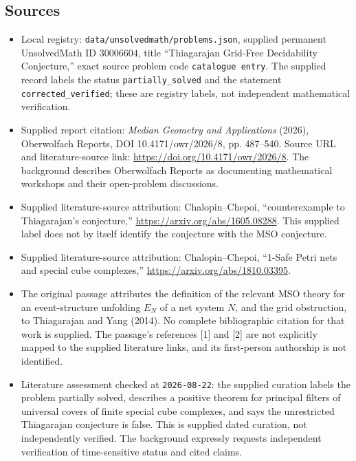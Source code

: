 \documentclass[11pt]{article}
\begin{document}
\subsection{Sources}
\begin{itemize}
\item Local registry: \texttt{data/unsolvedmath/problems.json}, supplied permanent UnsolvedMath ID \(30006604\), title ``Thiagarajan Grid-Free Decidability Conjecture,'' exact source problem code \texttt{catalogue entry}. The supplied record labels the status \texttt{partially\_solved} and the statement \texttt{corrected\_verified}; these are registry labels, not independent mathematical verification.
\item Supplied report citation: \emph{Median Geometry and Applications} (2026), Oberwolfach Reports, DOI 10.4171/owr/2026/8, pp. 487--540. Source URL and literature-source link: \url{https://doi.org/10.4171/owr/2026/8}. The background describes Oberwolfach Reports as documenting mathematical workshops and their open-problem discussions.
\item Supplied literature-source attribution: Chalopin--Chepoi, ``counterexample to Thiagarajan's conjecture,'' \url{https://arxiv.org/abs/1605.08288}. This supplied label does not by itself identify the conjecture with the MSO conjecture.
\item Supplied literature-source attribution: Chalopin--Chepoi, ``1-Safe Petri nets and special cube complexes,'' \url{https://arxiv.org/abs/1810.03395}.
\item The original passage attributes the definition of the relevant MSO theory for an event-structure unfolding \(E_N\) of a net system \(N\), and the grid obstruction, to Thiagarajan and Yang (2014). No complete bibliographic citation for that work is supplied. The passage's references [1] and [2] are not explicitly mapped to the supplied literature links, and its first-person authorship is not identified.
\item Literature assessment checked at \texttt{2026-08-22}: the supplied curation labels the problem partially solved, describes a positive theorem for principal filters of universal covers of finite special cube complexes, and says the unrestricted Thiagarajan conjecture is false. This is supplied dated curation, not independently verified. The background expressly requests independent verification of time-sensitive status and cited claims.
\end{itemize}
\end{document}
